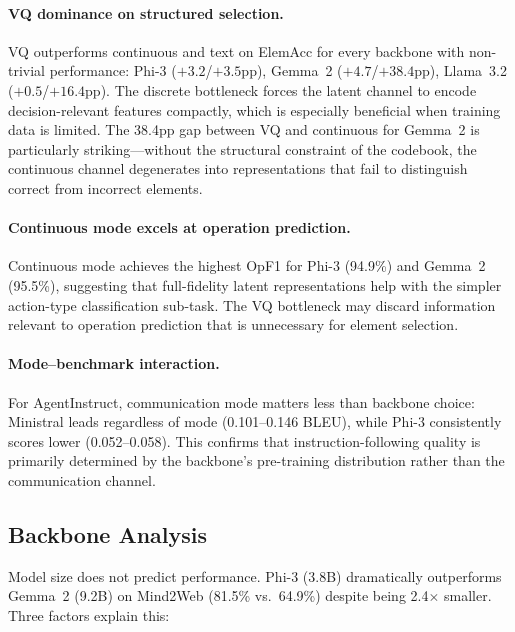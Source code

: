 \documentclass{article}
\begin{document}
\paragraph{VQ dominance on structured selection.}
VQ outperforms continuous and text on ElemAcc for every backbone with non-trivial performance: Phi-3 ($+3.2$/$+3.5$pp), Gemma~2 ($+4.7$/$+38.4$pp), Llama~3.2 ($+0.5$/$+16.4$pp).
The discrete bottleneck forces the latent channel to encode decision-relevant features compactly, which is especially beneficial when training data is limited.
The 38.4pp gap between VQ and continuous for Gemma~2 is particularly striking---without the structural constraint of the codebook, the continuous channel degenerates into representations that fail to distinguish correct from incorrect elements.

\paragraph{Continuous mode excels at operation prediction.}
Continuous mode achieves the highest OpF1 for Phi-3 (94.9\%) and Gemma~2 (95.5\%), suggesting that full-fidelity latent representations help with the simpler action-type classification sub-task.
The VQ bottleneck may discard information relevant to operation prediction that is unnecessary for element selection.

\paragraph{Mode--benchmark interaction.}
For AgentInstruct, communication mode matters less than backbone choice: Ministral leads regardless of mode (0.101--0.146 BLEU), while Phi-3 consistently scores lower (0.052--0.058).
This confirms that instruction-following quality is primarily determined by the backbone's pre-training distribution rather than the communication channel.

\subsection{Backbone Analysis}
\label{sec:backbone_analysis}

Model size does not predict performance.  Phi-3 (3.8B) dramatically outperforms Gemma~2 (9.2B) on Mind2Web (81.5\% vs.\ 64.9\%) despite being 2.4$\times$ smaller.  Three factors explain this:
\end{document}
